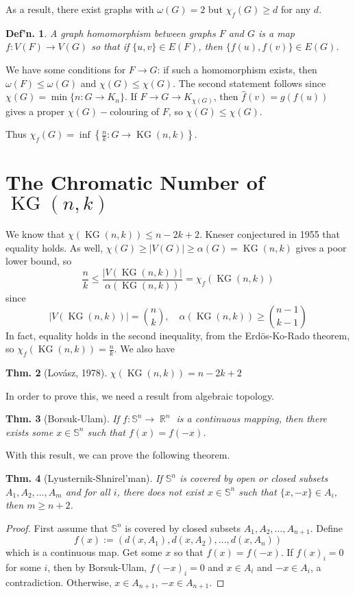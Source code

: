 \documentclass[12pt, a4paper]{book}
\DeclareMathOperator{\R}{\mathbb{R}}
\DeclareMathOperator{\KG}{KG}
\newtheorem{theorem}{Thm.}[section]
\newtheorem{definition}[theorem]{Def'n.}
\theoremstyle{nonumberplain}
\newtheorem{proof}{Proof}
\begin{document}
As a result, there exist graphs with $\omega(G)=2$ but $\chi_f(G)\geq d$ for any $d$.
\begin{definition}
    A graph homomorphism between graphs $F$ and $G$ is a map $f:V(F)\to V(G)$ so that if $\{u,v\}\in E(F)$, then $\{f(u),f(v)\}\in E(G)$.
\end{definition}
We have some conditions for $F\to G$: if such a homomorphism exists, then $\omega(F)\leq\omega(G)$ and $\chi(G)\leq\chi(G)$.
The second statement follows since $\chi(G)=\min\{n:G\to K_n\}$.
If $F\to G\to K_{\chi(G)}$, then $\hat f(v)=g(f(u))$ gives a proper $\chi(G)-$colouring of $F$, so $\chi(G)\leq\chi(G)$.

Thus $\chi_f(G)=\inf\left\{\frac{n}{k}:G\to \KG(n,k)\right\}$.
\section{The Chromatic Number of $\KG(n,k)$}
We know that $\chi(\KG(n,k))\leq n-2k+2$.
Kneser conjectured in 1955 that equality holds.
As well, $\chi(G)\geq|V(G)|\geq\alpha(G)=\KG(n,k)$ gives a poor lower bound, so
\[\frac{n}{k}\leq \frac{|V(\KG(n,k))|}{\alpha(\KG(n,k))}=\chi_f(\KG(n,k))\]
since
\[|V(\KG(n,k))|=\binom{n}{k},\quad\alpha(\KG(n,k))\geq\binom{n-1}{k-1}\]
In fact, equality holds in the second inequality, from the Erd\"os-Ko-Rado theorem, so $\chi_f(\KG(n,k))=\frac{n}{k}$.
We also have
\begin{theorem}[Lov\'asz, 1978]
    $\chi(\KG(n,k))=n-2k+2$
\end{theorem}
In order to prove this, we need a result from algebraic topology.
\begin{theorem}[Borsuk-Ulam]
    If $f:\mathbb{S}^n\to\R^n$ is a continuous mapping, then there exists some $x\in\mathbb{S}^n$ such that $f(x)=f(-x)$.
\end{theorem}
With this result, we can prove the following theorem.
\begin{theorem}[Lyusternik-Shnirel'man]
    If $\mathbb{S}^n$ is covered by open or closed subsets $A_1,A_2,\ldots,A_m$ and for all $i$, there does not exist $x\in\mathbb{S}^n$ such that $\{x,-x\}\in A_i$, then $m\geq n+2$.
\end{theorem}
\begin{proof}
    First assume that $\mathbb{S}^n$ is covered by closed subsets $A_1,A_2,\ldots,A_{n+1}$.
    Define
    \[f(x):=(d(x,A_1),d(x,A_2),\ldots,d(x,A_n))\]
    which is a continuous map.
    Get some $x$ so that $f(x)=f(-x)$.
    If $f(x)_i=0$ for some $i$, then by Borsuk-Ulam, $f(-x)_i=0$ and $x\in A_i$ and $-x\in A_i$, a contradiction.
    Otherwise, $x\in A_{n+1}$, $-x\in A_{n+1}$.
\end{proof}
\end{document}
